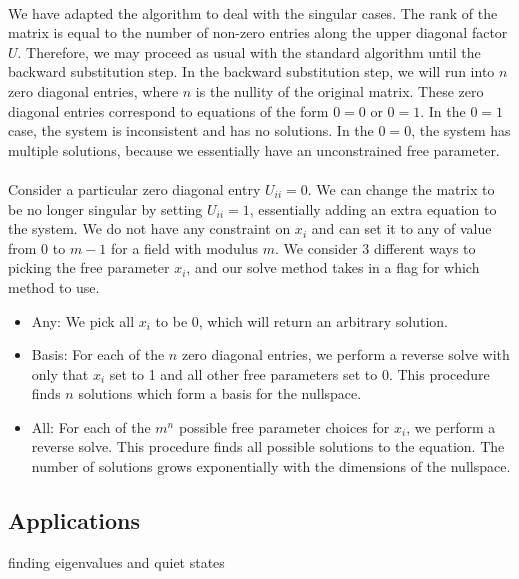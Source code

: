 \documentclass[11pt]{article}
\begin{document}
\paragraph{} We have adapted the algorithm to deal with the singular cases.  The rank of the matrix is equal to the number of non-zero entries along the upper diagonal factor $U$.  Therefore, we may proceed as usual with the standard algorithm until the backward substitution step.  In the backward substitution step, we will run into $n$ zero diagonal entries, where $n$ is the nullity of the original matrix.  These zero diagonal entries correspond to equations of the form $0 = 0$ or $0 = 1$.  In the $0 = 1$ case, the system is inconsistent and has no solutions.  In the $0 = 0$, the system has multiple solutions, because we essentially have an unconstrained free parameter.


\paragraph{} Consider a particular zero diagonal entry $U_{ii} = 0$.  We can change the matrix to be no longer singular by setting $U_{ii} = 1$, essentially adding an extra equation to the system.  We do not have any constraint on $x_i$ and can set it to any of value from 0 to $m - 1$ for a field with modulus $m$.  We consider 3 different ways to picking the free parameter $x_i$, and our solve method takes in a flag for which method to use.

\begin{itemize}
\item Any: We pick all $x_i$ to be 0, which will return an arbitrary solution.
\item Basis: For each of the $n$ zero diagonal entries, we perform a reverse solve with only that $x_i$ set to 1 and all other free parameters set to 0.  This procedure finds $n$ solutions which form a basis for the nullspace.
\item All: For each of the $m^n$ possible free parameter choices for $x_i$, we perform a reverse solve.  This procedure finds all possible solutions to the equation.  The number of solutions grows exponentially with the dimensions of the nullspace.
\end{itemize}

\subsection*{Applications}
finding eigenvalues and quiet states
\end{document}
